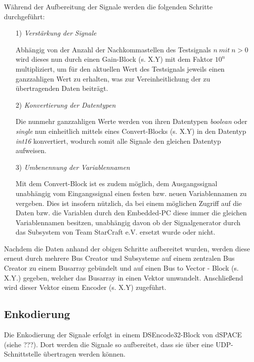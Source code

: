 \documentclass[fontsize = 12pt, paper = a4]{scrreprt}
\begin{document}
\newpage


Während der Aufbereitung der Signale werden die folgenden Schritte durchgeführt:

\begin{itemize}

\item[1)] \textit{Verstärkung der Signale}

Abhängig von der Anzahl der Nachkommastellen des Testsignals $n\ mit\ n>0$ wird dieses nun durch einen Gain-Block (s. X.Y) mit dem Faktor $10^n$ multipliziert, um für den aktuellen Wert des Testsignals jeweils einen ganzzahligen Wert zu erhalten, was zur Vereinheitlichung der zu übertragenden Daten beiträgt.

\item[2)] \textit{Konvertierung der Datentypen}

Die nunmehr ganzzahligen Werte werden von ihren Datentypen \textit{boolean} oder \textit{single} nun einheitlich mittels eines Convert-Blocks (s. X.Y) in den Datentyp \textit{int16} konvertiert, wodurch somit alle Signale den gleichen Datentyp aufweisen.  

\item[3)] \textit{Umbenennung der Variablennamen}

Mit dem Convert-Block ist es zudem möglich, dem Ausgangssignal unabhängig vom Eingangssignal einen festen bzw. neuen Variablennamen zu vergeben. Dies ist insofern nützlich, da bei einem möglichen Zugriff auf die Daten bzw. die Variablen durch den Embedded-PC diese immer die gleichen Variablennamen besitzen, unabhängig davon ob der Signalgenerator durch das Subsystem von Team StarCraft e.V. ersetzt wurde oder nicht.

\end{itemize}  

Nachdem die Daten anhand der obigen Schritte aufbereitet wurden, werden diese erneut durch mehrere Bus Creator und Subsysteme auf einem zentralen Bus Creator zu einem Busarray gebündelt und auf einen Bus to Vector - Block (s. X.Y.) gegeben, welcher das Busarray in einen Vektor umwandelt. Anschließend wird dieser Vektor einem Encoder (s. X.Y) zugeführt.

\subsection{Enkodierung}

Die Enkodierung der Signale erfolgt in einem DSEncode32-Block von dSPACE (siehe ???). Dort werden die Signale so aufbereitet, dass sie über eine UDP-Schnittstelle übertragen werden können. 
\end{document}
